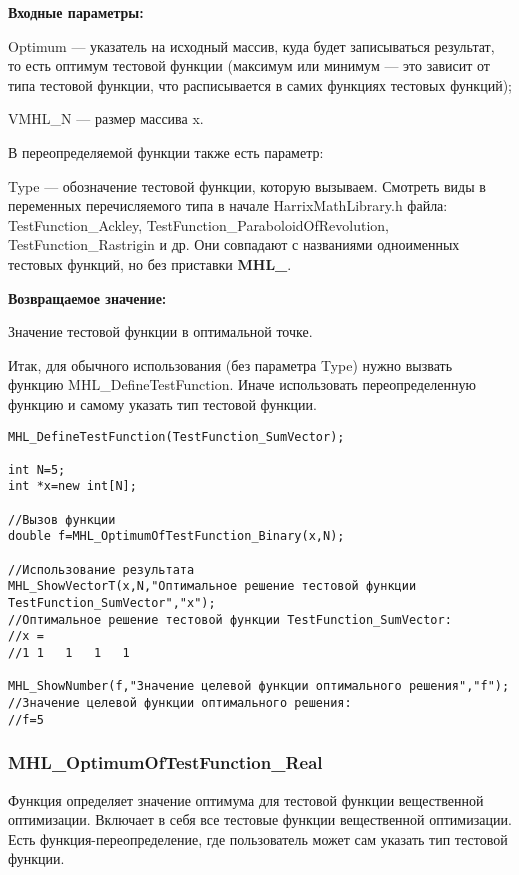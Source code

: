 \documentclass[a4paper,12pt]{article}
\begin{document}
\textbf{Входные параметры:}

Optimum --- указатель на исходный массив, куда будет записываться результат, то есть оптимум тестовой функции (максимум или минимум --- это зависит от типа тестовой функции, что расписывается в самих функциях тестовых функций);

     VMHL\_N --- размер массива x.

В переопределяемой функции также есть параметр:
  
Type --- обозначение тестовой функции, которую вызываем.
Смотреть виды в переменных перечисляемого типа в начале HarrixMathLibrary.h файла: TestFunction\_Ackley, TestFunction\_ParaboloidOfRevolution, TestFunction\_Rastrigin и др. Они совпадают с названиями одноименных тестовых функций, но без приставки \textbf{MHL\_}.

\textbf{Возвращаемое значение:}
 
Значение тестовой функции в оптимальной точке.

Итак, для обычного использования (без параметра Type) нужно вызвать функцию MHL\_DefineTestFunction. Иначе использовать переопределенную функцию и самому указать тип тестовой функции.


\begin{lstlisting}[label=code_use_MHL_OptimumOfTestFunction_Binary,caption=Пример использования]
MHL_DefineTestFunction(TestFunction_SumVector);

int N=5;
int *x=new int[N];

//Вызов функции
double f=MHL_OptimumOfTestFunction_Binary(x,N);

//Использование результата
MHL_ShowVectorT(x,N,"Оптимальное решение тестовой функции TestFunction_SumVector","x");
//Оптимальное решение тестовой функции TestFunction_SumVector:
//x =	
//1	1	1	1	1

MHL_ShowNumber(f,"Значение целевой функции оптимального решения","f");
//Значение целевой функции оптимального решения:
//f=5
\end{lstlisting}

\subsubsection{MHL\_OptimumOfTestFunction\_Real}\label{MHL_OptimumOfTestFunction_Real}

Функция определяет значение оптимума для тестовой функции вещественной оптимизации. Включает в себя все тестовые функции вещественной оптимизации. Есть функция-переопределение, где пользователь может сам указать тип тестовой функции.
\end{document}
